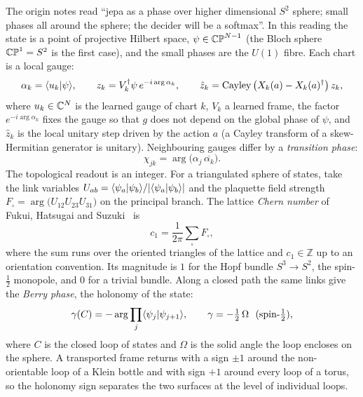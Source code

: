 The origin notes read ``jepa as a phase over higher dimensional $S^2$ sphere; small phases all around the sphere; the decider will be a softmax''. In this reading the state is a point of projective Hilbert space, $\psi\in\mathbb{CP}^{N-1}$ (the Bloch sphere $\mathbb{CP}^1=S^2$ is the first case), and the small phases are the $U(1)$ fibre. Each chart is a local gauge:
\begin{equation}\label{eq:gauge}
  \alpha_k=\langle u_k\vert \psi\rangle,\qquad z_k=V_k^{\dagger}\psi\,e^{-i\arg\alpha_k},\qquad \hat z_k=\operatorname{Cayley}\big(X_k(a)-X_k(a)^{\dagger}\big)\,z_k,
\end{equation}
where $u_k\in\mathbb{C}^N$ is the learned gauge of chart $k$, $V_k$ a learned frame, the factor $e^{-i\arg\alpha_k}$ fixes the gauge so that $g$ does not depend on the global phase of $\psi$, and $\hat z_k$ is the local unitary step driven by the action $a$ (a Cayley transform of a skew-Hermitian generator is unitary). Neighbouring gauges differ by a \emph{transition phase}:
\begin{equation}\label{eq:transphase}
  \chi_{jk}=\arg\big(\alpha_j\,\overline{\alpha_k}\big).
\end{equation}
The topological readout is an integer. For a triangulated sphere of states, take the link variables $U_{ab}=\langle \psi_a\vert \psi_b\rangle/\lvert\langle \psi_a\vert \psi_b\rangle\rvert$ and the plaquette field strength $F_\square=\arg\!\big(U_{12}U_{23}U_{31}\big)$ on the principal branch. The lattice \emph{Chern number} of Fukui, Hatsugai and Suzuki~\cite{fhs2005} is
\begin{equation}\label{eq:chern}
  c_1=\frac{1}{2\pi}\sum_{\square}F_\square,
\end{equation}
where the sum runs over the oriented triangles of the lattice and $c_1\in\mathbb Z$ up to an orientation convention. Its magnitude is $1$ for the Hopf bundle $S^3\to S^2$, the spin-$\tfrac12$ monopole, and $0$ for a trivial bundle. Along a closed path the same links give the \emph{Berry phase}, the holonomy of the state:
\begin{equation}\label{eq:berry}
  \gamma(C)=-\arg\prod_j\langle \psi_j\vert \psi_{j+1}\rangle,\qquad \gamma=-\tfrac12\,\Omega\ \ \text{(spin-$\tfrac12$)},
\end{equation}
where $C$ is the closed loop of states and $\Omega$ is the solid angle the loop encloses on the sphere. A transported frame returns with a sign $\pm1$ around the non-orientable loop of a Klein bottle and with sign $+1$ around every loop of a torus, so the holonomy sign separates the two surfaces at the level of individual loops.

